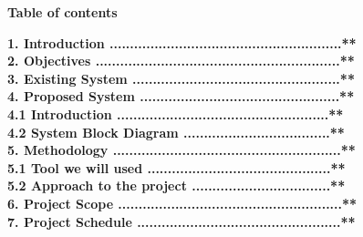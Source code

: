 \documentclass[a4paper]{article}
\begin{document}
\newpage
{


	\begin{center}
		\textbf{ \huge{Table of contents}}
		\vspace{30pt}
	\end{center}


	\vspace{20pt}

	\Large{

		\textbf{1. Introduction	.........................................................** \\ }
		\vspace{20pt}
		\textbf{2. Objectives  ............................................................**\\}
		\vspace{20pt}
		\textbf{3. Existing System ...................................................**\\}
		\vspace{20pt}
		\textbf{4. Proposed System .................................................**\\}
		\vspace{20pt}
		\hspace{15pt}\textbf{4.1 Introduction ....................................................** \\}
		\vspace{20pt}
		\hspace{15pt}\textbf{4.2 System Block Diagram ....................................** \\}
		\vspace{20pt}
		\textbf{5. Methodology ........................................................**\\}
		\vspace{20pt}
		\hspace{15pt}\textbf{5.1 Tool we will used .............................................** \\}
		\vspace{20pt}
		\hspace{15pt}\textbf{5.2 Approach to the project ..................................**  \\}
		\vspace{20pt}
		\textbf{6. Project Scope .......................................................** \\}
		\vspace{20pt}
		\textbf{7. Project Schedule ..................................................**}
		\vspace{20pt}

	}

}
\end{document}
